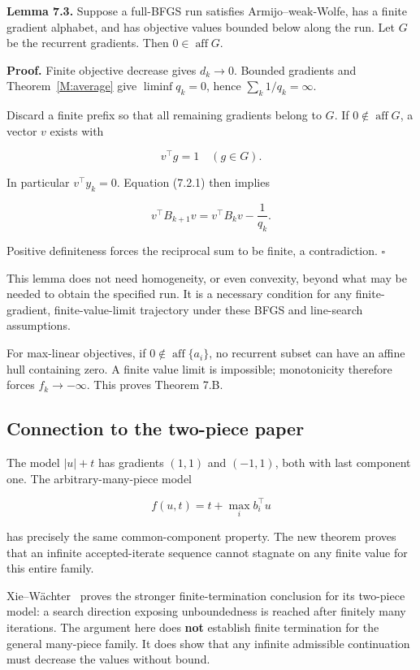 \textbf{Lemma 7.3.} Suppose a full-BFGS run satisfies Armijo--weak-Wolfe,
has a finite gradient alphabet, and has objective values bounded below
along the run. Let \(G\) be the recurrent gradients. Then
\(0\in\operatorname{aff}G\).

\textbf{Proof.} Finite objective decrease gives \(d_k\to0\). Bounded
gradients and Theorem~\ref{M:average} give \(\liminf q_k=0\), hence
\(\sum_k1/q_k=\infty\).

Discard a finite prefix so that all remaining gradients belong to \(G\).
If \(0\notin\operatorname{aff}G\), a vector \(v\) exists with

\[
v^\top g=1\quad(g\in G).
\]

In particular \(v^\top y_k=0\). Equation (7.2.1) then implies

\[
v^\top B_{k+1}v=v^\top B_kv-\frac1{q_k}.
\]

Positive definiteness forces the reciprocal sum to be finite, a
contradiction. \(\square\)

This lemma does not need homogeneity, or even convexity, beyond what may
be needed to obtain the specified run. It is a necessary condition for
any finite-gradient, finite-value-limit trajectory under these BFGS and
line-search assumptions.

For max-linear objectives, if \(0\notin\operatorname{aff}\{a_i\}\), no
recurrent subset can have an affine hull containing zero. A finite value
limit is impossible; monotonicity therefore forces \(f_k\to-\infty\).
This proves Theorem 7.B.



\subsection{Connection to the two-piece
paper}\label{H:connection-to-the-two-piece-paper}


The model \(|u|+t\) has gradients \((1,1)\) and \((-1,1)\), both with
last component one. The arbitrary-many-piece model

\[
f(u,t)=t+\max_i b_i^\top u
\]

has precisely the same common-component property. The new theorem proves
that an infinite accepted-iterate sequence cannot stagnate on any finite
value for this entire family.

Xie--W\"achter~\cite{XW} proves the stronger finite-termination conclusion
for its two-piece model: a search direction exposing unboundedness is
reached after finitely many iterations. The argument here does
\textbf{not} establish finite termination for the general many-piece
family. It does show that any infinite admissible continuation must
decrease the values without bound.

